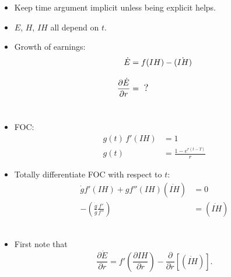 \documentclass[12pt,compress,handout]{beamer}  %
\begin{document}
\begin{frame}

\begin{itemize}
\item
Keep time argument implicit unless being explicit helps.\\[3mm]

\item
$E$, $H$, $IH$ all depend on $t$.\\[3mm]

\item
Growth of earnings:
\begin{align*}
\dot{E} & =f(IH)-(\dot{IH})\\[3mm]
\frac{\partial \dot{E}}{\partial r} & =\ \text{\large ?}
\end{align*}\ \\[3mm]
\item FOC:
\begin{align*}
g(t)\,f'(IH) & =1\\[3mm]
g(t) & =\frac{1-e^{r(t-T)}}{r}
\end{align*}
\end{itemize}
\end{frame}


\begin{frame}

\begin{itemize}
\item
Totally differentiate FOC with respect to $t$:
\begin{align*}
\dot{g}f'(IH)+gf''(IH)(\dot{IH}) & =0\\[3mm]
-\left( \frac{\dot{g}}{g}\frac{f'}{f''}\right) & =(\dot{IH})
\end{align*}\ \\[3mm]
\item First note that
\begin{equation*}
\frac{\partial \dot{E}}{\partial r}=f'\left( \frac{\partial
IH}{\partial r}\right) -\frac{\partial }{\partial r}\left[
(\dot{IH})\right] \text{.}
\end{equation*}
\end{itemize}

\end{frame}
\end{document}
